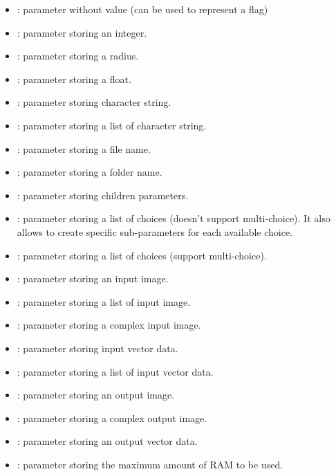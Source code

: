 \begin{itemize}
  \item {} : parameter without value (can be used to represent 
  a flag)
  \item {} : parameter storing an integer.
  \item {} : parameter storing a radius.
  \item {} : parameter storing a float.
  \item {} : parameter storing character string.
  \item {} : parameter storing a list of character string.
  \item {} : parameter storing a file name.
  \item {} : parameter storing a folder name.
  \item {} : parameter storing children parameters.
  \item {} : parameter storing a list of choices (doesn't support
  multi-choice). It also allows to create specific sub-parameters for each available choice.
  \item {} : parameter storing a list of choices (support 
  multi-choice).
  \item {} : parameter storing an input image.
  \item {} : parameter storing a list of input image.
  \item {} : parameter storing a complex input image.
  \item {} : parameter storing input vector data.
  \item {} : parameter storing a list of input vector data.
  \item {} : parameter storing an output image.
  \item {} : parameter storing a complex output image.
  \item {} : parameter storing an output vector data.
  \item {} : parameter storing the maximum amount of RAM to be used.
\end{itemize}

